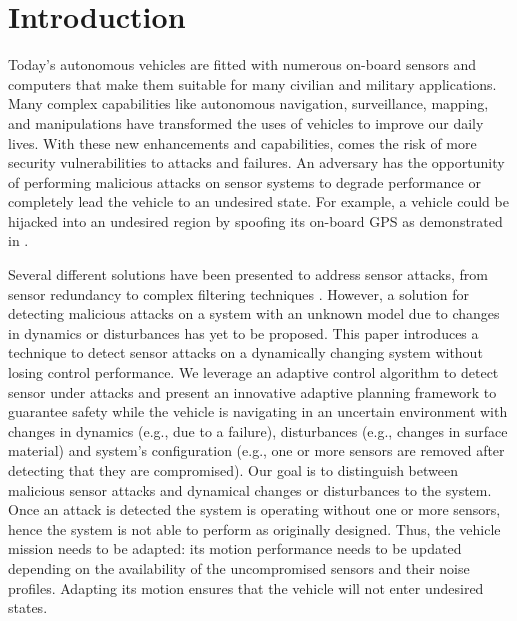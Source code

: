 
\section{Introduction} \label{sec:introduction}

Today's autonomous vehicles are fitted with numerous on-board sensors and computers that make them suitable for many civilian and military applications. Many complex capabilities like autonomous navigation, surveillance, mapping, and manipulations have transformed the uses of vehicles to improve our daily lives. 
With these new enhancements and capabilities, comes the risk of more security vulnerabilities to attacks and failures. An adversary has the opportunity of performing malicious attacks on sensor systems to degrade performance or completely lead the vehicle to an undesired state. For example, a vehicle could be hijacked into an undesired region by spoofing its on-board GPS as demonstrated in \cite{lee}.

Several different solutions have been presented to address sensor attacks, from sensor redundancy to complex filtering techniques \cite{fawzi2014secure,pasqualetti2013attack,6120187,6943080,7330811}. However, a solution for detecting malicious attacks on a system with an unknown model due to changes in dynamics or disturbances has yet to be proposed. This paper introduces a technique to detect sensor attacks on a dynamically changing system without losing control performance. We leverage an adaptive control algorithm to detect sensor under attacks and present an innovative adaptive planning framework to guarantee safety while the vehicle is navigating in an uncertain environment with changes in dynamics (e.g., due to a failure), disturbances (e.g., changes in surface material) and system's configuration (e.g., one or more sensors are removed after detecting that they are compromised). 
Our goal is to distinguish between malicious sensor attacks and dynamical changes or disturbances to the system. Once an attack is detected the system is operating without one or more sensors, hence the system is not able to perform as originally designed.  Thus, the vehicle mission needs to be adapted: its motion performance needs  to be updated depending on the availability of the uncompromised sensors and their noise profiles.  Adapting its motion ensures that the vehicle will not enter undesired states. 

